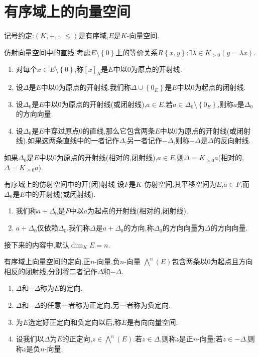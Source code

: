 \section{有序域上的向量空间}

记号约定:$\left(K,+,\cdot,\leq\right)$是有序域,$E$是$K$-向量空间.

\begin{definition}{仿射向量空间中的直线}{}
	考虑$E\setminus\left\{0\right\}$上的等价关系$R\left\{x,y\right\}$:$\exists\lambda\in K_{>0}\left(y=\lambda x\right)$.
	\begin{enumerate}
		\item 对每个$x\in E\setminus\left\{0\right\}$,称$\left[x\right]_{R}$是$E$中以$0$为原点的开射线.
		\item 设$\Delta$是$E$中以$0$为原点的开射线.我们称$\Delta\cup\left\{0_{E}\right\}$是$E$中以$0$为起点的闭射线.
		\item 设$\Delta_{0}$是$E$中以$0$为原点的开射线(或闭射线),$a\in E$.若$a\in\Delta_{0}\setminus\left\{0_{E}\right\}$,则称$a$是$\Delta_{0}$的方向向量.
		\item 设$\Delta_{0}$是$E$中穿过原点$0$的直线,那么它包含两条$E$中以$0$为原点的开射线(或闭射线).如果这两条直线中的一者记作$\Delta$,另一者记作$-\Delta$,则称$-\Delta$是$\Delta$的反向射线.
	\end{enumerate}
\end{definition}

\begin{remark}{}{}
	如果$\Delta_{0}$是$E$中以$0$为原点的开射线(相对的,闭射线),$a\in E$,则$\Delta=K_{>0}a$(相对的,$\Delta=K_{\geq 0}a$).
\end{remark}

\begin{definition}{有序域上的仿射空间中的开(闭)射线}{}
	设$F$是$K$-仿射空间,其平移空间为$E$,$a\in F$,而$\Delta_{0}$是$E$中的开射线(或闭射线).
	\begin{enumerate}
		\item 我们称$a+\Delta_{0}$是$F$中以$a$为起点的开射线(相对的,闭射线).
		\item $a+\Delta_{0}$仅依赖$\Delta_{0}$.我们称$\Delta$是$a+\Delta_{0}$的方向,称$\Delta_{0}$的方向向量为$\Delta$的方向向量.
	\end{enumerate}
\end{definition}

接下来的内容中,默认$\dim_{K}E=n$.

\begin{definition}{有序域上向量空间的定向,正$n$-向量,负$n$-向量}{}
	$\bigwedge\limits^{n}\left(E\right)$包含两条以$0$为起点且方向相反的闭射线,分别将二者记作$\Delta$和$-\Delta$.
	\begin{enumerate}
		\item $\Delta$和$-\Delta$称为$E$的定向.
		\item $\Delta$和$-\Delta$的任意一者称为正定向,另一者称为负定向.
		\item 为$E$选定好正定向和负定向以后,称$E$是有向向量空间.
		\item 设我们以$\Delta$为$E$的正定向,$z\in\bigwedge\limits^{n}\left(E\right)$.若$z\in\Delta$,则称$z$是正$n$-向量;若$z\in -\Delta$,则称$z$是负$n$-向量.
	\end{enumerate}
\end{definition}

